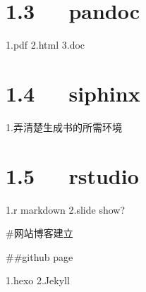 \documentclass[letterpaper,12pt,english]{sphinxmanual}
\begin{document}
\section{1.3   pandoc}
\label{\detokenize{002plan/readyToDo:pandoc}}
1.pdf 2.html 3.doc


\section{1.4   siphinx}
\label{\detokenize{002plan/readyToDo:siphinx}}
1.弄清楚生成书的所需环境


\section{1.5   rstudio}
\label{\detokenize{002plan/readyToDo:rstudio}}
1.r markdown 2.slide show?

\#网站博客建立

\#\#github page

1.hexo 2.Jekyll
\end{document}
